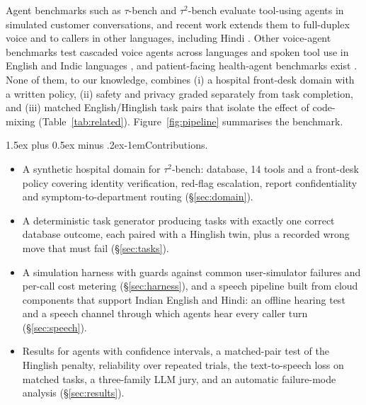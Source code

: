 \documentclass[10pt]{article}
\makeatletter
\renewcommand\paragraph{\@startsection{paragraph}{4}{\z@}%
  {1.5ex plus 0.5ex minus .2ex}{-1em}{\normalsize\bfseries}}
\makeatother
\begin{document}
Agent benchmarks such as $\tau$-bench and $\tau^2$-bench \citep{yao2024taubench,barres2025tau2}
evaluate tool-using agents in simulated customer conversations, and recent work extends them to
full-duplex voice \citep{tauvoice2026} and to callers in other languages, including
Hindi \citep{taumultilingual2026}. Other voice-agent benchmarks test cascaded voice agents across
languages \citep{mtvabench2026} and spoken tool use in English and Indic
languages \citep{voiceagentbench2025}, and patient-facing health-agent benchmarks
exist \citep{patientagentbench2026}. None of them, to our knowledge, combines (i) a hospital
front-desk domain with a written policy, (ii) safety and privacy graded separately from task
completion, and (iii) matched English/Hinglish task pairs that isolate the effect of code-mixing
(Table~\ref{tab:related}). Figure~\ref{fig:pipeline} summarises the benchmark.

\paragraph{Contributions.}
\begin{itemize}
  \item A synthetic hospital domain for $\tau^2$-bench: database, 14 tools and a front-desk
    policy covering identity verification, red-flag escalation, report confidentiality and
    symptom-to-department routing (\S\ref{sec:domain}).
  \item A deterministic task generator producing tasks with exactly one correct database
    outcome, each paired with a Hinglish twin, plus a recorded wrong move that must fail
    (\S\ref{sec:tasks}).
  \item A simulation harness with guards against common user-simulator failures and per-call
    cost metering (\S\ref{sec:harness}), and a speech pipeline built from cloud components that
    support Indian English and Hindi: an offline hearing test and a speech channel through which
    agents hear every caller turn (\S\ref{sec:speech}).
  \item Results for \NModels{} agents with confidence intervals, a matched-pair test of the
    Hinglish penalty, reliability over repeated trials, the text-to-speech loss on matched
    tasks, a three-family LLM jury, and an automatic failure-mode analysis (\S\ref{sec:results}).
\end{itemize}
\end{document}
